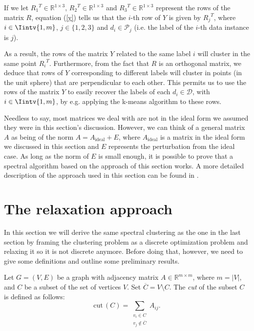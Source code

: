 If we let ${R_1}^T \in \mathbb{R}^{1 \times 3}$, ${R_2}^T \in \mathbb{R}^{1 \times 3}$ and ${R_3}^T \in \mathbb{R}^{1 \times 3}$ represent the rows of the matrix $R$, equation (\ref{y}) tells us that the $i$-th row of $Y$ is given by ${R_j} ^T$, where $i \in \Iintv{1,m}$, $j \in \{1, 2, 3 \}$ and $d_i \in \mathcal P_j$ (i.e. the label of the $i$-th data instance is $j$).

As a result, the rows of the matrix $Y$ related to the same label $i$ will cluster in the same point ${R_i}^T$.
Furthermore, from the fact that $R$ is an orthogonal matrix, we deduce that rows of $Y$ corresponding to different labels will cluster in points (in the unit sphere) that are perpendicular to each other. 
This permits us to use the rows of the matrix $Y$ to easily recover the labels of each $d_i \in \mathcal D$, with $i \in \Iintv{1,m}$, by e.g. applying the k-means algorithm to these rows.

Needless to say, most matrices we deal with are not in the ideal form we assumed they were in this section's discussion.
However, we can think of a general matrix $A$ as being of the norm $A = A_{\text{ideal}} + E$, where $A_{\text{ideal}}$ is a matrix in the ideal form we discussed in this section and $E$ represents the perturbation from the ideal case.
As long as the norm of $E$ is small enough, it is possible to prove that a spectral algorithm based on the approach of this section works.
A more detailed description of the approach used in this section can be found in \cite{ng}.


\section{The relaxation approach}
In this section we will derive the same spectral clustering as the one in the last section by framing the clustering problem as a discrete optimization problem and relaxing it so it is not discrete anymore.
Before doing that, however, we need to give some definitions and outline some preliminary results.

\begin{definition}
   Let $G = (V,E)$ be a graph with adjacency matrix $A \in \mathbb R^{m \times m}$, where $m = |V|$, and $C$ be a subset of the set of vertices $V$. 
   Set $\overline{C} = V \setminus C$.
   The \textit{cut} of the subset $C$ is defined as follows:
   \begin{equation}
      \text{cut}\, (C) = \sum_{\substack{v_i \in C \\ v_j \notin \overline C }} A_{ij}.
   \end{equation}
\end{definition}

